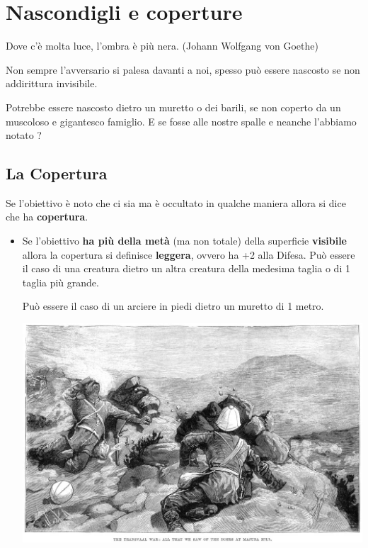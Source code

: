 \section{Nascondigli e coperture} 

\begin{changemargin}{0.3cm}{0.3cm}\begin{enfasi}
\begin{center}
Dove c'è molta luce, l'ombra è più nera. (Johann Wolfgang von Goethe)
\end{center}
\end{enfasi}\end{changemargin}\medskip

\begin{multicols}{2}

Non sempre l'avversario si palesa davanti a noi, spesso può essere nascosto se non addirittura invisibile.

Potrebbe essere nascosto dietro un muretto o dei barili, se non coperto da un muscoloso e gigantesco famiglio.
E se fosse alle nostre spalle e neanche l'abbiamo notato ?

\subsection{La Copertura} \label{copertura}\hypertarget{copertura}{}

Se l'obiettivo è noto che ci sia ma è occultato in qualche maniera allora si dice che ha \textbf{copertura}.

\begin{itemize}[leftmargin=*] \setlength{\itemsep}{0pt}
\item
Se l'obiettivo \textbf{ha più della metà} (ma non totale) della superficie \textbf{visibile} allora la copertura si definisce \textbf{leggera}, ovvero ha +2 alla Difesa. Può essere il caso di una creatura dietro un altra creatura della medesima taglia o di 1 taglia più grande.

Può essere il caso di un arciere in piedi dietro un muretto di 1 metro.


\begin{center}
\includegraphics[width=0.9\linewidth]{immagini/hide.png}


\end{center}
\end{itemize}
\end{multicols}
